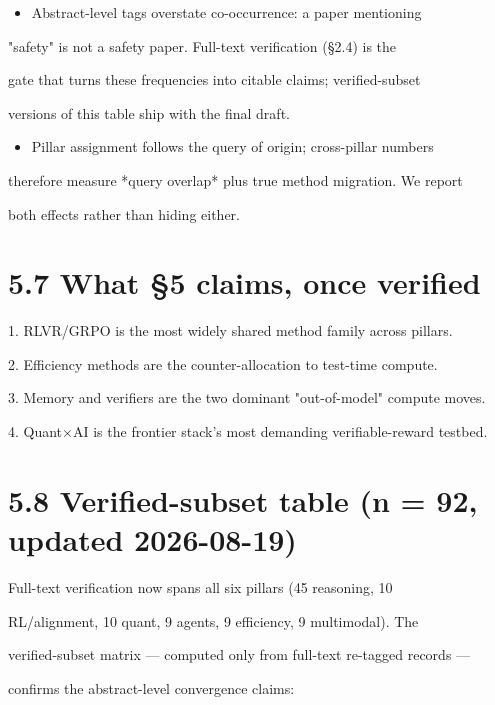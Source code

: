 \documentclass[11pt]{article}
\begin{document}
\begin{itemize}
\item Abstract-level tags overstate co-occurrence: a paper mentioning
\end{itemize}
"safety" is not a safety paper. Full-text verification (\S2.4) is the

gate that turns these frequencies into citable claims; verified-subset

versions of this table ship with the final draft.

\begin{itemize}
\item Pillar assignment follows the query of origin; cross-pillar numbers
\end{itemize}
therefore measure *query overlap* plus true method migration. We report

both effects rather than hiding either.


\section{5.7 What \S5 claims, once verified}

1. RLVR/GRPO is the most widely shared method family across pillars.

2. Efficiency methods are the counter-allocation to test-time compute.

3. Memory and verifiers are the two dominant "out-of-model" compute moves.

4. Quant$\times$AI is the frontier stack's most demanding verifiable-reward testbed.


\section{5.8 Verified-subset table (n = 92, updated 2026-08-19)}

Full-text verification now spans all six pillars (45 reasoning, 10

RL/alignment, 10 quant, 9 agents, 9 efficiency, 9 multimodal). The

verified-subset matrix --- computed only from full-text re-tagged records ---

confirms the abstract-level convergence claims:
\end{document}
